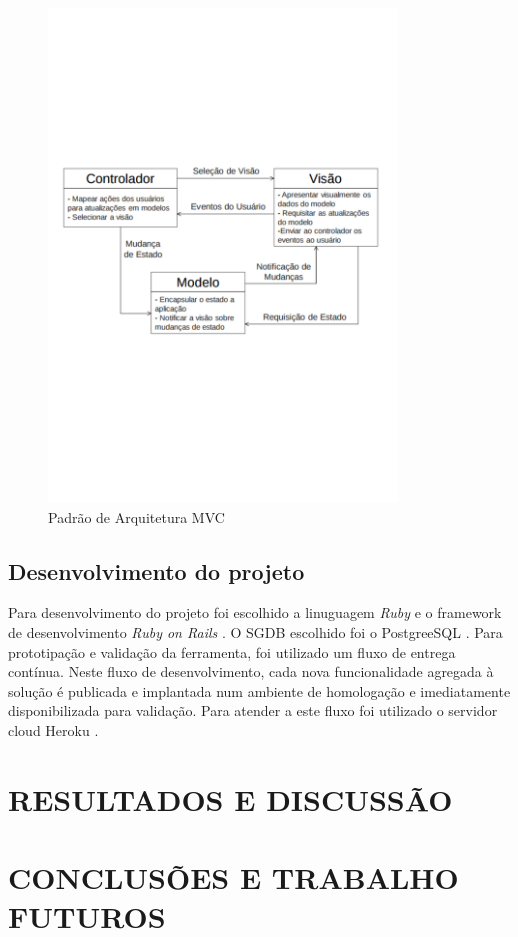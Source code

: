 \documentclass{abnt}
\begin{document}
\begin{figure}[!htb]
	\centering
	\includegraphics[width=350px]{mvc.pdf}
	\caption{Padrão de Arquitetura MVC}
	\label{MVCC}
\end{figure}

\section{Desenvolvimento do projeto}

Para desenvolvimento do projeto foi escolhido a linuguagem \textit{Ruby} 
\cite{Ruby} e o framework de desenvolvimento \textit{Ruby on Rails} \cite{Rails}.
O SGDB \cite{SGDB} escolhido foi o PostgreeSQL \cite{Postgree}. Para
prototipação e validação da ferramenta, foi utilizado um fluxo de entrega
contínua. Neste fluxo de desenvolvimento, cada nova funcionalidade agregada à
solução é publicada e implantada num ambiente de homologação e imediatamente
disponibilizada para validação. Para atender a este fluxo foi utilizado o
servidor cloud Heroku \cite{Heroku}.

\chapter{RESULTADOS E DISCUSSÃO}



\chapter{CONCLUSÕES E TRABALHO FUTUROS}
\end{document}
